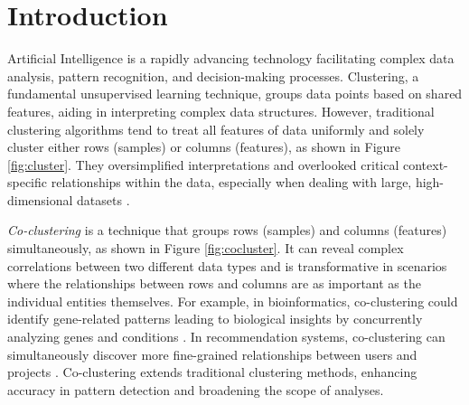
\section{Introduction}
Artificial Intelligence is a rapidly advancing technology facilitating complex data analysis, pattern recognition, and decision-making processes. Clustering, a fundamental unsupervised learning technique, groups data points based on shared features, aiding in interpreting complex data structures. However, traditional clustering algorithms \cite{zhang2023AdaptiveGraphConvolution, yuan2023JointNetworkTopology, wu2023EffectiveClusteringStructured}  tend to treat all features of data uniformly and solely cluster either rows (samples) or columns (features),  as shown in Figure \ref{fig:cluster}. They oversimplified interpretations and overlooked critical context-specific relationships within the data, especially when dealing with large, high-dimensional datasets \cite{chen2023FastFlexibleBipartite, zhao2023MultiviewCoclusteringMultisimilarity, kumar2023CoclusteringBasedMethods}.

\textit{Co-clustering} \cite{cheng2000BiclusteringExpressionData, kluger2003SpectralBiclusteringMicroarray, yan2017CoclusteringMultidimensionalBig} is a technique that groups rows (samples) and columns (features) simultaneously, as shown in Figure \ref{fig:cocluster}. It can reveal complex correlations between two different data types and is transformative in scenarios where the relationships between rows and columns are as important as the individual entities themselves. For example, in bioinformatics, co-clustering could identify gene-related patterns leading to biological insights by concurrently analyzing genes and conditions \cite{higham2007SpectralClusteringIts, kluger2003SpectralBiclusteringMicroarray, madeira2004BiclusteringAlgorithmsBiological, zhao2012BiclusteringAnalysisPattern, golchev2015BiclusteringAnalysisGene}. In recommendation systems, co-clustering can simultaneously discover more fine-grained relationships between users and projects \cite{dhillon2007WeightedGraphCuts, chen2023ParallelNonNegativeMatrix, bouchareb2019ModelBasedCoclustering}. Co-clustering extends traditional clustering methods, enhancing accuracy in pattern detection and broadening the scope of analyses.

